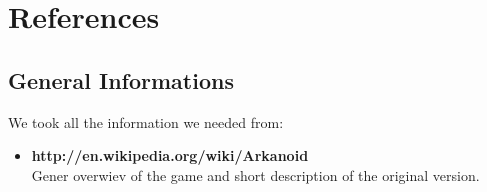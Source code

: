 \chapter*{References}
\label{cha:references}

\section*{General Informations}
\label{sec:general}

We took all the information we needed from:

\begin{itemize}
  \item \textbf{http://en.wikipedia.org/wiki/Arkanoid}\\
    Gener overwiev of the game and short description of the original version.
\end{itemize}